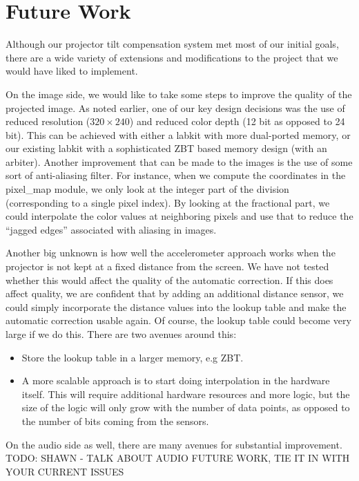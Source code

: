 \documentclass{article}
\begin{document}
\section{Future Work}
Although our projector tilt compensation system met most of our initial goals,
there are a wide variety of extensions and modifications to the project that we would have liked to implement.

On the image side, we would like to take some steps to improve the quality of the projected image.
As noted earlier, one of our key design decisions was the use of reduced resolution ($320 \times 240$) and reduced color depth (12 bit as opposed to 24 bit).
This can be achieved with either a labkit with more dual-ported memory, or our existing labkit with a sophisticated ZBT based memory design (with an arbiter).
Another improvement that can be made to the images is the use of some sort of anti-aliasing filter.
For instance, when we compute the coordinates in the pixel\_map module, we only look at the integer part of the division (corresponding to a single pixel index).
By looking at the fractional part, we could interpolate the color values at neighboring pixels and use that to reduce the ``jagged edges'' associated with aliasing in images.

Another big unknown is how well the accelerometer approach works when the projector is not kept at a fixed distance from the screen.
We have not tested whether this would affect the quality of the automatic correction.
If this does affect quality, we are confident that by adding an additional distance sensor,
we could simply incorporate the distance values into the lookup table and make the automatic correction usable again.
Of course, the lookup table could become very large if we do this.
There are two avenues around this:
\begin{itemize}
    \item Store the lookup table in a larger memory, e.g ZBT.
    \item A more scalable approach is to start doing interpolation in the hardware itself.
        This will require additional hardware resources and more logic,
        but the size of the logic will only grow with the number of data points,
        as opposed to the number of bits coming from the sensors.
\end{itemize}

On the audio side as well, there are many avenues for substantial improvement.
TODO: SHAWN - TALK ABOUT AUDIO FUTURE WORK, TIE IT IN WITH YOUR CURRENT ISSUES
\end{document}
